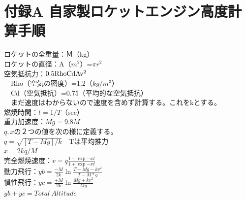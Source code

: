 \section{付録A 自家製ロケットエンジン高度計算手順}
ロケットの全重量：Ｍ（kg）\\

ロケットの直径：A（$m^2$）=$\pi r^2$\\

空気抵抗力：$0.5\rm{Rho}\rm{Cd}\rm{A}v^2$\\
　Rho（空気の密度）=1.2（$kg/m^3$）\\
　Cd（空気抵抗）=0.75（平均的な空気抵抗）\\
　まだ速度はわからないので速度を含めず計算する。これをkとする。\\

燃焼時間：$t=1/T$（sec）\\

重力加速度：$Mg=9.8M$\\

$q,x$の２つの値を次の様に定義する。\\
$q=\sqrt{[T-Mg]/k}$　Tは平均推力\\
$x=2kq/M$\\

完全燃焼速度：$v=q\frac{1-\exp{-xt}}{ 1+\exp{-xt}}$\\

動力飛行：$yb=\frac{-M}{2k}\ln \frac{T-Mg-kv^2} {T-M*g}$\\
慣性飛行：$yc=\frac{+M}{2k}\ln \frac{Mg+kv^2} {Mg}$\\

$yb+yc=Total\ Altitude$

